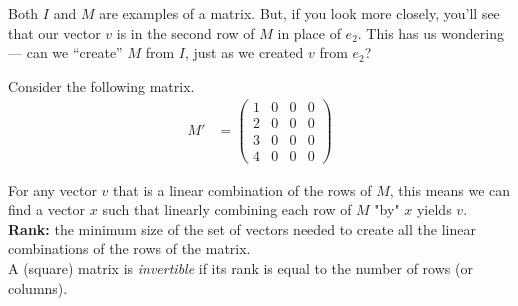 \documentclass[12pt]{extarticle}
\begin{document}
  Both $I$ and $M$ are examples of a matrix. But, if you look more closely, you'll see that our vector $v$ is in the second row of $M$ in place of $e_2$. This has us wondering --- can we ``create'' $M$ from $I$, just as we created $v$ from $e_2$? 

  \newpage

  Consider the following matrix.
  \begin{align*}
    M' &= \begin{pmatrix}1&0&0&0\\2&0&0&0\\3&0&0&0 \\ 4&0&0&0\end{pmatrix}
  \end{align*}

  \vspace{10cm}

  For any vector $v$ that is a linear combination of the rows of $M$, this means we can find a vector $x$ such that linearly combining each row of $M$ "by" $x$ yields $v$.
  \newpage
  \textbf{Rank:} the minimum size of the set of vectors needed to create all the linear combinations of the rows of the matrix.\\

  \newpage
  A (square) matrix is \textit{invertible} if its rank is equal to the number of rows (or columns).\\
\end{document}
